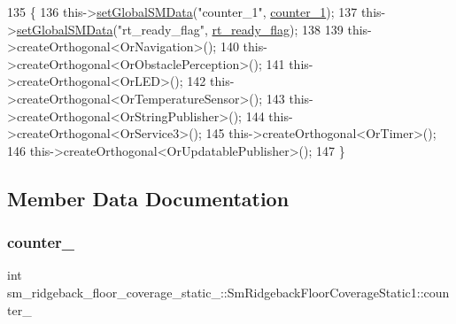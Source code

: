 \begin{DoxyCode}
135     \{
136         this->\hyperlink{classsmacc_1_1ISmaccStateMachine_a8588f9e580fbb95b53e2bd2ca3ff1f98}{setGlobalSMData}(\textcolor{stringliteral}{"counter\_1"}, \hyperlink{structsm__ridgeback__floor__coverage__static__1_1_1SmRidgebackFloorCoverageStatic1_a369dd32c8362fc491428cff56a8bd170}{counter\_1});
137         this->\hyperlink{classsmacc_1_1ISmaccStateMachine_a8588f9e580fbb95b53e2bd2ca3ff1f98}{setGlobalSMData}(\textcolor{stringliteral}{"rt\_ready\_flag"}, \hyperlink{structsm__ridgeback__floor__coverage__static__1_1_1SmRidgebackFloorCoverageStatic1_a6b31072566a8039b4165b803b8468069}{rt\_ready\_flag});
138 
139         this->createOrthogonal<OrNavigation>();
140         this->createOrthogonal<OrObstaclePerception>();
141         this->createOrthogonal<OrLED>();
142         this->createOrthogonal<OrTemperatureSensor>();
143         this->createOrthogonal<OrStringPublisher>();
144         this->createOrthogonal<OrService3>();
145         this->createOrthogonal<OrTimer>();
146         this->createOrthogonal<OrUpdatablePublisher>();
147     \}
\end{DoxyCode}


\subsection{Member Data Documentation}
\mbox{\label{structsm__ridgeback__floor__coverage__static__1_1_1SmRidgebackFloorCoverageStatic1_a369dd32c8362fc491428cff56a8bd170}} 
\subsubsection{\texorpdfstring{counter\+\_}{counter\_1}}
{\footnotesize\ttfamily int sm\+\_\+ridgeback\+\_\+floor\+\_\+coverage\+\_\+static\+\_\+::\+Sm\+Ridgeback\+Floor\+Coverage\+Static1\+::counter\+\_}



